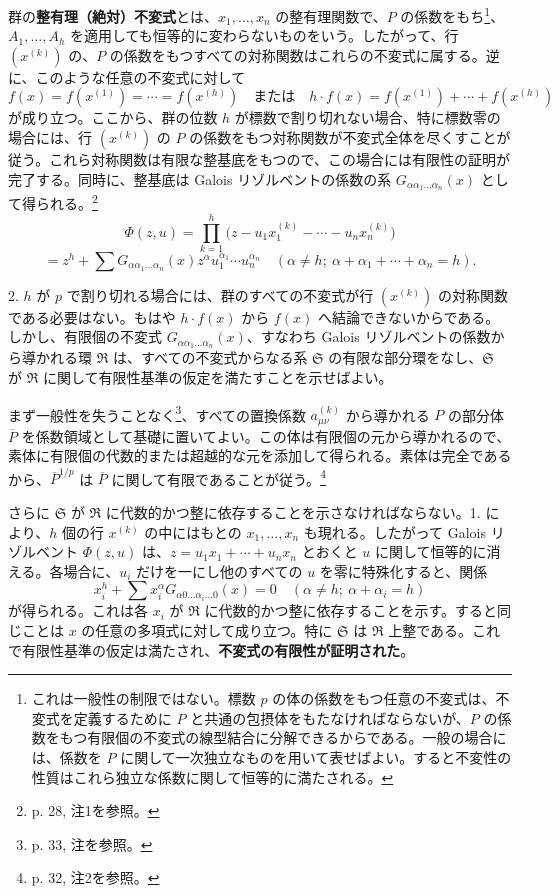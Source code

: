 \documentclass[11pt]{article}
\begin{document}
群の\textbf{整有理（絶対）不変式}とは、$x_1,\ldots,x_n$ の整有理関数で、$P$ の係数をもち\footnote{これは一般性の制限ではない。標数 $p$ の体の係数をもつ任意の不変式は、不変式を定義するために $P$ と共通の包摂体をもたなければならないが、$P$ の係数をもつ有限個の不変式の線型結合に分解できるからである。一般の場合には、係数を $P$ に関して一次独立なものを用いて表せばよい。すると不変性の性質はこれら独立な係数に関して恒等的に満たされる。}、$A_1,\ldots,A_h$ を適用しても恒等的に変わらないものをいう。したがって、行 $(x^{(k)})$ の、$P$ の係数をもつすべての対称関数はこれらの不変式に属する。逆に、このような任意の不変式に対して
\[
 f(x)=f(x^{(1)})=\cdots=f(x^{(h)})
 \quad\text{または}\quad
 h\cdot f(x)=f(x^{(1)})+\cdots+f(x^{(h)})
\]
が成り立つ。ここから、群の位数 $h$ が標数で割り切れない場合、特に標数零の場合には、行 $(x^{(k)})$ の $P$ の係数をもつ対称関数が不変式全体を尽くすことが従う。これら対称関数は有限な整基底をもつので、この場合には有限性の証明が完了する。同時に、整基底は Galois リゾルベントの係数の系 $G_{\alpha\alpha_1\ldots\alpha_n}(x)$ として得られる。\footnote{p. 28, 注1を参照。}
\[
 \Phi(z,u)=\prod_{k=1}^{h}\bigl(z-u_1x_1^{(k)}-\cdots-u_nx_n^{(k)}\bigr)
\]
\[
 =z^h+\sum G_{\alpha\alpha_1\ldots\alpha_n}(x)
 z^{\alpha}u_1^{\alpha_1}\cdots u_n^{\alpha_n}
 \quad(\alpha\ne h;\ \alpha+\alpha_1+\cdots+\alpha_n=h).
\]

2. $h$ が $p$ で割り切れる場合には、群のすべての不変式が行 $(x^{(k)})$ の対称関数である必要はない。もはや $h\cdot f(x)$ から $f(x)$ へ結論できないからである。しかし、有限個の不変式 $G_{\alpha\alpha_1\ldots\alpha_n}(x)$、すなわち Galois リゾルベントの係数から導かれる環 $\mathfrak R$ は、すべての不変式からなる系 $\mathfrak S$ の有限な部分環をなし、$\mathfrak S$ が $\mathfrak R$ に関して有限性基準の仮定を満たすことを示せばよい。

まず一般性を失うことなく\footnote{p. 33, 注を参照。}、すべての置換係数 $a_{\mu\nu}^{(k)}$ から導かれる $P$ の部分体 $\overline P$ を係数領域として基礎に置いてよい。この体は有限個の元から導かれるので、素体に有限個の代数的または超越的な元を添加して得られる。素体は完全であるから、$\overline P^{1/p}$ は $\overline P$ に関して有限であることが従う。\footnote{p. 32, 注2を参照。}

さらに $\mathfrak S$ が $\mathfrak R$ に代数的かつ整に依存することを示さなければならない。1. により、$h$ 個の行 $x^{(k)}$ の中にはもとの $x_1,\ldots,x_n$ も現れる。したがって Galois リゾルベント $\Phi(z,u)$ は、$z=u_1x_1+\cdots+u_nx_n$ とおくと $u$ に関して恒等的に消える。各場合に、$u_i$ だけを一にし他のすべての $u$ を零に特殊化すると、関係
\[
 x_i^h+\sum x_i^\alpha G_{\alpha0\ldots\alpha_i\ldots0}(x)=0
 \quad (\alpha\ne h;\ \alpha+\alpha_i=h)
\]
が得られる。これは各 $x_i$ が $\mathfrak R$ に代数的かつ整に依存することを示す。すると同じことは $x$ の任意の多項式に対して成り立つ。特に $\mathfrak S$ は $\mathfrak R$ 上整である。これで有限性基準の仮定は満たされ、\textbf{不変式の有限性が証明された}。
\end{document}
